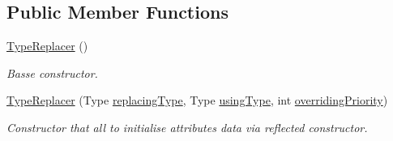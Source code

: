 \subsection*{Public Member Functions}
\begin{DoxyCompactItemize}
\item 
\mbox{\hyperlink{class_uniform_data_operator_1_1_assemblies_management_1_1_modifiers_1_1_type_replacer_a467c5c1990d36d4b4d5a7847fd794a2f}{Type\+Replacer}} ()
\begin{DoxyCompactList}\small\item\em Basse constructor. \end{DoxyCompactList}\item 
\mbox{\hyperlink{class_uniform_data_operator_1_1_assemblies_management_1_1_modifiers_1_1_type_replacer_a53ed7a62064129d34748e8cde818e191}{Type\+Replacer}} (Type \mbox{\hyperlink{class_uniform_data_operator_1_1_assemblies_management_1_1_modifiers_1_1_type_replacer_a92c79d556f9906ecfae49fd97816aa1e}{replacing\+Type}}, Type \mbox{\hyperlink{class_uniform_data_operator_1_1_assemblies_management_1_1_modifiers_1_1_type_replacer_a9ff1766eb3660514a89255bf15c16742}{using\+Type}}, int \mbox{\hyperlink{class_uniform_data_operator_1_1_assemblies_management_1_1_modifiers_1_1_type_replacer_a677ea9d2870e47626a39bf6e64015f18}{overriding\+Priority}})
\begin{DoxyCompactList}\small\item\em Constructor that all to initialise attribute\textquotesingle{}s data via reflected constructor. \end{DoxyCompactList}\end{DoxyCompactItemize}
